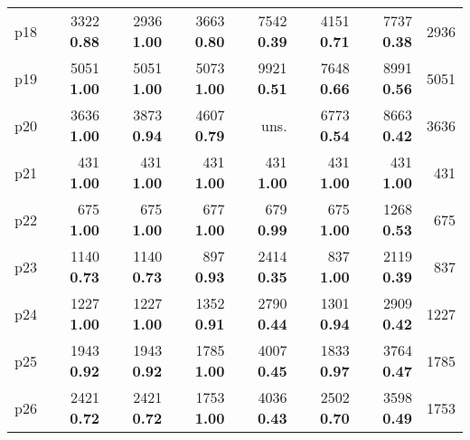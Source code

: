 \begin{tabular}{lrrrrrrr}
\multicolumn{1}{l|}{p18} & {\footnotesize 3322} \textbf{0.88} & {\footnotesize 2936} \textbf{1.00} & {\footnotesize 3663} \textbf{0.80} & {\footnotesize 7542} \textbf{0.39} & {\footnotesize 4151} \textbf{0.71} & {\footnotesize 7737} \textbf{0.38} & \multicolumn{1}{|r}{2936}\\
\multicolumn{1}{l|}{p19} & {\footnotesize 5051} \textbf{1.00} & {\footnotesize 5051} \textbf{1.00} & {\footnotesize 5073} \textbf{1.00} & {\footnotesize 9921} \textbf{0.51} & {\footnotesize 7648} \textbf{0.66} & {\footnotesize 8991} \textbf{0.56} & \multicolumn{1}{|r}{5051}\\
\multicolumn{1}{l|}{p20} & {\footnotesize 3636} \textbf{1.00} & {\footnotesize 3873} \textbf{0.94} & {\footnotesize 4607} \textbf{0.79} & uns. & {\footnotesize 6773} \textbf{0.54} & {\footnotesize 8663} \textbf{0.42} & \multicolumn{1}{|r}{3636}\\
\multicolumn{1}{l|}{p21} & {\footnotesize 431} \textbf{1.00} & {\footnotesize 431} \textbf{1.00} & {\footnotesize 431} \textbf{1.00} & {\footnotesize 431} \textbf{1.00} & {\footnotesize 431} \textbf{1.00} & {\footnotesize 431} \textbf{1.00} & \multicolumn{1}{|r}{431}\\
\multicolumn{1}{l|}{p22} & {\footnotesize 675} \textbf{1.00} & {\footnotesize 675} \textbf{1.00} & {\footnotesize 677} \textbf{1.00} & {\footnotesize 679} \textbf{0.99} & {\footnotesize 675} \textbf{1.00} & {\footnotesize 1268} \textbf{0.53} & \multicolumn{1}{|r}{675}\\
\multicolumn{1}{l|}{p23} & {\footnotesize 1140} \textbf{0.73} & {\footnotesize 1140} \textbf{0.73} & {\footnotesize 897} \textbf{0.93} & {\footnotesize 2414} \textbf{0.35} & {\footnotesize 837} \textbf{1.00} & {\footnotesize 2119} \textbf{0.39} & \multicolumn{1}{|r}{837}\\
\multicolumn{1}{l|}{p24} & {\footnotesize 1227} \textbf{1.00} & {\footnotesize 1227} \textbf{1.00} & {\footnotesize 1352} \textbf{0.91} & {\footnotesize 2790} \textbf{0.44} & {\footnotesize 1301} \textbf{0.94} & {\footnotesize 2909} \textbf{0.42} & \multicolumn{1}{|r}{1227}\\
\multicolumn{1}{l|}{p25} & {\footnotesize 1943} \textbf{0.92} & {\footnotesize 1943} \textbf{0.92} & {\footnotesize 1785} \textbf{1.00} & {\footnotesize 4007} \textbf{0.45} & {\footnotesize 1833} \textbf{0.97} & {\footnotesize 3764} \textbf{0.47} & \multicolumn{1}{|r}{1785}\\
\multicolumn{1}{l|}{p26} & {\footnotesize 2421} \textbf{0.72} & {\footnotesize 2421} \textbf{0.72} & {\footnotesize 1753} \textbf{1.00} & {\footnotesize 4036} \textbf{0.43} & {\footnotesize 2502} \textbf{0.70} & {\footnotesize 3598} \textbf{0.49} & \multicolumn{1}{|r}{1753}\\

\end{tabular}

